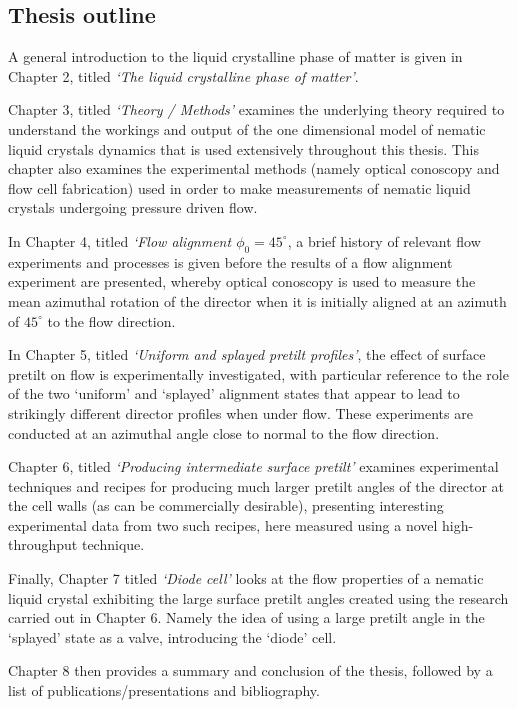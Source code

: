 \subsection{Thesis outline}
A general introduction to the liquid crystalline phase of matter is given in Chapter 2, titled \textit{`The liquid crystalline phase of matter'}.
 
Chapter 3, titled \textit{`Theory / Methods'} examines the underlying theory required to understand the workings and output of the one dimensional model of nematic liquid crystals dynamics that is used extensively throughout this thesis. This chapter also examines the experimental methods (namely optical conoscopy and flow cell fabrication) used in order to make measurements of nematic liquid crystals undergoing pressure driven flow.
 
In Chapter 4, titled \textit{`Flow alignment $\phi_0=45^{\circ}$}, a brief history of relevant flow experiments and processes is given before the results of a flow alignment experiment are presented, whereby optical conoscopy is used to measure the mean azimuthal rotation of the director when it is initially aligned at an azimuth of $45^{\circ}$ to the flow direction.

In Chapter 5, titled \textit{`Uniform and splayed pretilt profiles'}, the effect of surface pretilt on flow is experimentally investigated, with particular reference to the role of the two `uniform' and `splayed' alignment states that appear to lead to strikingly different director profiles when under flow. These experiments are conducted at an azimuthal angle close to normal to the flow direction.
 
Chapter 6, titled \textit{`Producing intermediate surface pretilt'} examines experimental techniques and recipes for producing much larger pretilt angles of the director at the cell walls (as can be commercially desirable), presenting interesting experimental data from two such recipes, here measured using a novel high-throughput technique.

Finally, Chapter 7 titled \textit{`Diode cell'} looks at the flow properties of a nematic liquid crystal exhibiting the large surface pretilt angles created using the research carried out in Chapter 6. Namely the idea of using a large pretilt angle in the `splayed' state as a valve, introducing the `diode' cell.
 
Chapter 8 then provides a summary and conclusion of the thesis, followed by a list of publications/presentations and bibliography.